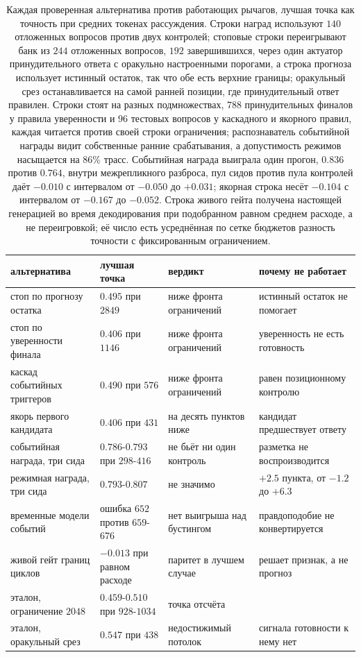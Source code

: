 \documentclass[11pt]{article}
\begin{document}
\begin{table}[t]
\centering
\footnotesize
\setlength{\tabcolsep}{4pt}
\begin{tabular}{llll}
\toprule
альтернатива & лучшая точка & вердикт & почему не работает \\
\midrule
стоп по прогнозу остатка & $0.495$ при $2849$ & ниже фронта ограничений & истинный остаток не помогает \\
стоп по уверенности финала & $0.406$ при $1146$ & ниже фронта ограничений & уверенность не есть готовность \\
каскад событийных триггеров & $0.490$ при $576$ & ниже фронта ограничений & равен позиционному контролю \\
якорь первого кандидата & $0.406$ при $431$ & на десять пунктов ниже & кандидат предшествует ответу \\
событийная награда, три сида & $0.786$-$0.793$ при $298$-$416$ & не бьёт ни один контроль & разметка не воспроизводится \\
режимная награда, три сида & $0.793$-$0.807$ & не значимо & $+2.5$ пункта, от $-1.2$ до $+6.3$ \\
временные модели событий & ошибка $652$ против $659$-$676$ & нет выигрыша над бустингом & правдоподобие не конвертируется \\
живой гейт границ циклов & $-0.013$ при равном расходе & паритет в лучшем случае & решает признак, а не прогноз \\
\midrule
эталон, ограничение $2048$ & $0.459$-$0.510$ при $928$-$1034$ & точка отсчёта & \\
эталон, оракульный срез & $0.547$ при $438$ & недостижимый потолок & сигнала готовности к нему нет \\
\bottomrule
\end{tabular}
\caption{Каждая проверенная альтернатива против работающих рычагов, лучшая точка как точность при средних токенах рассуждения. Строки наград используют $140$ отложенных вопросов против двух контролей; стоповые строки переигрывают банк из $244$ отложенных вопросов, $192$ завершившихся, через один актуатор принудительного ответа с оракульно настроенными порогами, а строка прогноза использует истинный остаток, так что обе есть верхние границы; оракульный срез останавливается на самой ранней позиции, где принудительный ответ правилен. Строки стоят на разных подмножествах, $788$ принудительных финалов у правила уверенности и $96$ тестовых вопросов у каскадного и якорного правил, каждая читается против своей строки ограничения; распознаватель событийной награды видит собственные ранние срабатывания, а допустимость режимов насыщается на $86\%$ трасс. Событийная награда выиграла один прогон, $0.836$ против $0.764$, внутри межрепликного разброса, пул сидов против пула контролей даёт $-0.010$ с интервалом от $-0.050$ до $+0.031$; якорная строка несёт $-0.104$ с интервалом от $-0.167$ до $-0.052$. Строка живого гейта получена настоящей генерацией во время декодирования при подобранном равном среднем расходе, а не переигровкой; её число есть усреднённая по сетке бюджетов разность точности с фиксированным ограничением.}
\label{tab:negative}
\end{table}
\end{document}
